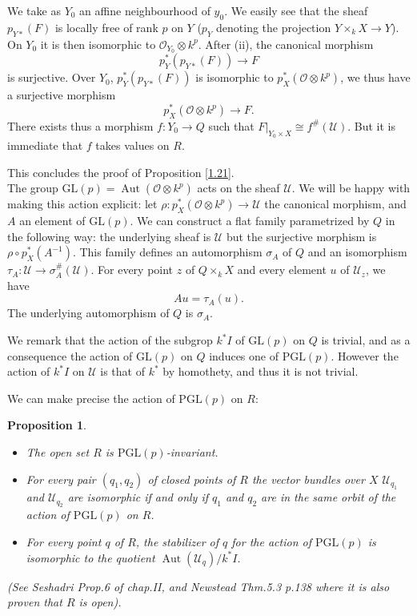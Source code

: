 \documentclass[12pt,a4paper]{book}
\DeclareMathOperator\Aut{Aut}
\def\OO{\mathscr{O}}
\def\UU{\mathscr{U}}
\def\PGL{\mathrm{PGL}}
\def\GL{\mathrm{GL}}
\newtheorem{prop}[thm]{Proposition}
\theoremstyle{definition} \newtheorem{defn}[thm]{Definition}
\theoremstyle{definition} \newtheorem{ejs}[thm]{Examples}
\theoremstyle{definition} \newtheorem{ej}[thm]{Example}
\begin{document}
   We take as $Y_0$ an affine neighbourhood of $y_0$. We easily see that the sheaf $p_{Y*}(F)$ is locally free of rank $p$ on $Y$ ($p_Y$ denoting the projection $Y\times_k X \rightarrow Y$). On $Y_0$ it is then isomorphic to $\OO_{Y_0}\otimes k^p$. After (ii), the canonical morphism
   \begin{equation*}
     p_Y^*(p_{Y*}(F))\longrightarrow F
   \end{equation*}
   is surjective. Over $Y_0$, $p_Y^*(p_{Y*}(F))$ is isomorphic to $p_X^*(\OO \otimes k^p)$, we thus have a surjective morphism
   \begin{equation*}
     p^*_X(\OO \otimes k^p) \longrightarrow F.
   \end{equation*}
   There exists thus a morphism $f:Y_0 \rightarrow Q$ such that $F|_{Y_0 \times X} \cong f^{\#}(\mathscr{U})$. But it is immediate that $f$ takes values on $R$.

   This concludes the proof of Proposition \ref{1.21}. \\

   The group $\GL(p)=\Aut(\OO\otimes k^p)$ acts on the sheaf $\UU$. We will be happy with making this action explicit: let $\rho:p_X^*(\OO\otimes k^p) \rightarrow \UU$ the canonical morphism, and $A$ an element of $\GL(p)$. We can construct a flat family parametrized by $Q$ in the following way: the underlying sheaf is $\UU$ but the surjective morphism is $\rho \circ p_X^*(A^{-1})$. This family defines an automorphism $\sigma_A$ of $Q$ and an isomorphism $\tau_A:\UU \rightarrow \sigma^{\#}_A(\UU)$. For every point $z$ of $Q\times_k X$ and every element $u$ of $\UU_z$, we have
   \begin{equation*}
     Au=\tau_A(u).
   \end{equation*}
   The underlying automorphism of $Q$ is $\sigma_A$.

   We remark that the action of the subgrop $k^* I$ of $\GL(p)$ on $Q$ is trivial, and as a consequence the action of $\GL(p)$ on $Q$ induces one of $\PGL(p)$. However the action of $k^* I$ on $\UU$ is that of $k^*$ by homothety, and thus it is not trivial.

   We can make precise the action of $\PGL(p)$ on $R$:
   \begin{prop}\label{1.22}
     \begin{itemize}
       \item[\rm (i)] The open set $R$ is $\PGL(p)$-invariant. 
       \item[\rm (ii)] For every pair $(q_1,q_2)$ of closed points of $R$ the vector bundles over $X$ $\UU_{q_1}$ and $\UU_{q_2}$ are isomorphic if and only if $q_1$ and $q_2$ are in the same orbit of the action of $\PGL(p)$ on $R$.
       \item[\rm (iii)] For every point $q$ of $R$, the stabilizer of $q$ for the action of $\PGL(p)$ is isomorphic to the quotient $\Aut(\UU_q)/k^*I$.
     \end{itemize}
     {\rm (See Seshadri \cite{36} Prop.6 of chap.II, and Newstead \cite{29} Thm.5.3 p.138 where it is also proven that $R$ is open).}
   \end{prop}
\end{document}
